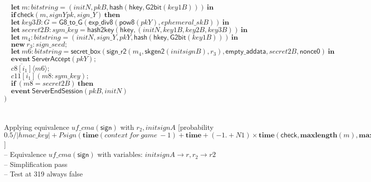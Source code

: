 \documentclass{article}
\newcommand{\cinput}[2]{{#1}({#2})}
\newcommand{\coutput}[2]{\overline{#1}\langle{#2}\rangle}
\newcommand{\kw}[1]{\mathbf{#1}}
\newcommand{\kwf}[1]{\mathsf{#1}}
\newcommand{\var}[1]{\mathit{#1}}
\newcommand{\kwt}[1]{\mathit{#1}}
\newcommand{\kwp}[1]{\mathit{#1}}
\newcommand{\kwc}[1]{\mathit{#1}}
\begin{document}
\begin{tabbing}
\>$\quad \kw{let}\ \var{m}: \kwt{bitstring} = \kwf{}(\var{initN}, \var{pkB}, \kwf{hash}(\kwf{hkey}, \kwf{G2bit}(\var{key1B})))\ \kw{in}$\\
\>$\quad \kw{if}\ \kwf{check}(\var{m}, \var{signYpk}, \var{sign{\_}Y})\ \kw{then}$\\
\>$\quad \kw{let}\ \var{key3B}: \kwt{G} = \kwf{G8{\_}to{\_}G}(\kwf{exp{\_}div8}(\kwf{pow8}(\var{pkY}), \var{ephemeral{\_}skB}))\ \kw{in}$\\
\>$\quad \kw{let}\ \var{secret2B}: \kwt{sym{\_}key} = \kwf{hash2key}(\kwf{hkey}, \kwf{}(\var{initN}, \var{key1B}, \var{key2B}, \var{key3B}))\ \kw{in}$\\
\>$\quad \kw{let}\ \var{m}_{4}: \kwt{bitstring} = \kwf{}(\var{initN}, \var{sign{\_}Y}, \var{pkY}, \kwf{hash}(\kwf{hkey}, \kwf{G2bit}(\var{key1B})))\ \kw{in}$\\
\>$\quad \kw{new}\ \var{r}_{3}: \kwt{sign{\_}seed};$\\
\>$\quad \kw{let}\ \var{m6}: \kwt{bitstring} = \kwf{secret{\_}box}(\kwf{sign{\_}r2}(\var{m}_{4}, \kwf{skgen2}(\var{initsignB}), \var{r}_{3}), \kwf{empty{\_}addata}, \var{secret2B}, \kwf{nonce0})\ \kw{in}$\\
\>$\quad \kw{event}\ \kwf{ServerAccept}(\var{pkY});$\\
\>$\quad \coutput{\kwc{c8}[\var{i}_{1}]}{\var{m6}};$\\
\>$\quad \cinput{\kwc{c11}[\var{i}_{1}]}{\var{m8}: \kwt{sym{\_}key}};$\\
\>$\quad \kw{if}\ (\var{m8}  =  \var{secret2B})\ \kw{then}$\\
\>$\quad \kw{event}\ \kwf{ServerEndSession}(\var{pkB}, \var{initN})$\\
\>$)$\\
\\
\\
Applying equivalence $\kwc{uf{\_}cma}(\kwf{sign})$ with $\var{r}_{2}, \var{initsignA}$ {}[probability $0.5 / |\kwt{hmac{\_}key}| + \var{Psign}(\kw{time}(\mathit{context\ for\ game}\ -1) + \kw{time} + (-1. + \kwp{N1}) \times \kw{time}(\kwf{check}, \kw{maxlength}(\var{m}), \allowbreak \kw{maxlength}(\var{sign{\_}Y})), \allowbreak \kwp{N1}, \allowbreak \kw{maxlength}(\var{m}_{3}))${}]{}\\
\quad -- Equivalence $\kwc{uf{\_}cma}(\kwf{sign})$ with $\textrm{variables: }\var{initsignA} \rightarrow \var{r}, \var{r}_{2} \rightarrow \var{r2}$\\
\quad -- Simplification pass\\
\qquad -- Test at 319 always false\\

\end{tabbing}
\end{document}
